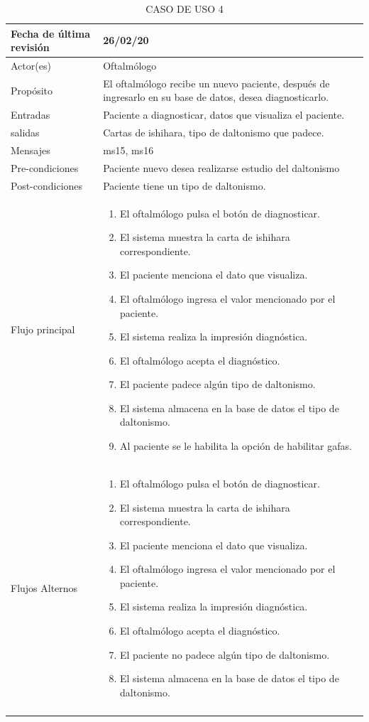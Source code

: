 \documentclass[10pt]{article}
\begin{document}
\begin{longtable}{|p{3.8cm}|p{10.8cm}|}
\hline
Fecha de última revisión & 26/02/20\\
\hline
Actor(es) & Oftalmólogo \\
\hline
Propósito & El oftalmólogo recibe un nuevo paciente, después de ingresarlo en su base de datos, desea diagnosticarlo. \\
\hline
Entradas & Paciente a diagnosticar, datos que visualiza el paciente.\\
\hline
salidas & Cartas de ishihara, tipo de daltonismo que padece. \\
\hline
Mensajes & ms15, ms16\\
\hline
Pre-condiciones & Paciente nuevo desea realizarse estudio del daltonismo\\
\hline
Post-condiciones & Paciente tiene un tipo de daltonismo.\\
\hline
Flujo principal & \begin{enumerate}
    \item El oftalmólogo pulsa el botón de diagnosticar.
    \item El sistema muestra la carta de ishihara correspondiente.
    \item El paciente menciona el dato que visualiza.
    \item El oftalmólogo ingresa el valor mencionado por el paciente.
    \item El sistema realiza la impresión diagnóstica.
    \item El oftalmólogo acepta el diagnóstico.
    \item El paciente padece algún tipo de daltonismo.
    \item El sistema almacena en la base de datos el tipo de daltonismo.
    \item Al paciente se le habilita la opción de habilitar gafas.
\end{enumerate}
    \\
\hline
Flujos Alternos &  \begin{enumerate}
    \item El oftalmólogo pulsa el botón de diagnosticar.
    \item El sistema muestra la carta de ishihara correspondiente.
    \item El paciente menciona el dato que visualiza.
    \item El oftalmólogo ingresa el valor mencionado por el paciente.
    \item El sistema realiza la impresión diagnóstica.
    \item El oftalmólogo acepta el diagnóstico.
    \item El paciente no padece algún tipo de daltonismo.
    \item El sistema almacena en la base de datos el tipo de daltonismo.
\end{enumerate}\\
\hline
\caption{CASO DE USO 4}
\label{tabla1}
\end{longtable}
\end{document}

